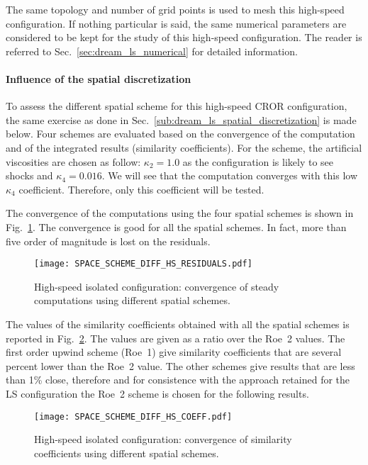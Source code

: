 
The same topology and number of grid points is used to
mesh this high-speed configuration. 
If nothing particular is said, the same numerical parameters
are considered to be kept for the study of this
high-speed configuration.
The reader is referred to 
Sec.~\ref{sec:dream_ls_numerical} for detailed information.

\paragraph{Influence of the spatial discretization}
\label{sub:dream_hs_spatial_discretization}

To assess the different spatial scheme for this high-speed
CROR configuration, the same exercise as done in 
Sec.~\ref{sub:dream_ls_spatial_discretization} is made below.
Four schemes are evaluated based 
on the convergence of the computation
and of the integrated 
results (similarity coefficients).
For the \citet{Jameson1981} scheme, the artificial viscosities
are chosen as follow: $\kappa_2 = 1.0$ as the configuration is likely to 
see shocks and $\kappa_4 = 0.016$. We will see that the computation converges
with this low $\kappa_4$ coefficient. Therefore, only this coefficient
will be tested.

The convergence of the computations using the four spatial schemes
is shown in Fig.~\ref{fig:DREAM_HS_RESIDUALS_PPT}. The convergence is good
for all the spatial schemes. In fact, more than five order of magnitude
is lost on the residuals.
\begin{figure}[htp]
  \centering
  \texttt{[image: SPACE\_SCHEME\_DIFF\_HS\_RESIDUALS.pdf]}
  \caption{High-speed isolated configuration: convergence 
  of steady computations using different spatial schemes.}
  \label{fig:DREAM_HS_RESIDUALS_PPT}
\end{figure}

The values of the similarity coefficients obtained with
all the spatial schemes is reported in 
Fig.~\ref{fig:dream_hs_space_scheme_coeff}. The values are
given as a ratio over the Roe~2 values. The first order
upwind scheme (Roe~1) give similarity coefficients that are
several percent lower than the Roe~2 value. The other schemes
give results that are less than 1\% close, therefore and for
consistence with the approach retained for the LS configuration
the Roe~2 scheme is chosen for the following results.
\begin{figure}[htp]
  \centering
  \texttt{[image: SPACE\_SCHEME\_DIFF\_HS\_COEFF.pdf]}
  \caption{High-speed isolated configuration: convergence of 
  similarity coefficients using different spatial schemes.}
  \label{fig:dream_hs_space_scheme_coeff}
\end{figure}

